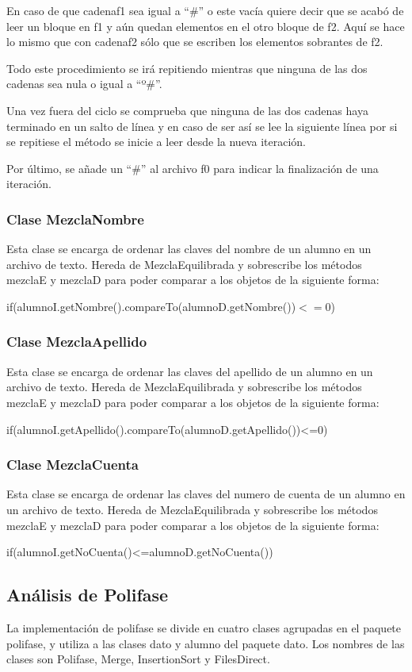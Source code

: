 \documentclass[11pt]{article}
\begin{document}
\begin{itemize}
\par 
En caso de que cadenaf1 sea igual a “\#” o este vacía quiere decir que se acabó de leer un bloque en f1 y aún quedan elementos en el otro bloque de f2. Aquí se hace lo mismo que con cadenaf2 sólo que se escriben los elementos sobrantes de f2.
\par 
Todo este procedimiento se irá repitiendo mientras que ninguna de las dos cadenas sea nula o igual a “º\#”.
\par 
Una vez fuera del ciclo se comprueba que ninguna de las dos cadenas haya terminado en un salto de línea y en caso de ser así se lee la siguiente línea por si se repitiese el método se inicie a leer desde la nueva iteración.
\par 
Por último, se añade un “\#” al archivo f0 para indicar la finalización de una iteración.
\end{itemize}

\subsubsection{Clase MezclaNombre}
Esta clase se encarga de ordenar las claves del nombre de un alumno en un archivo de texto. Hereda de MezclaEquilibrada y sobrescribe los métodos mezclaE y mezclaD para poder comparar a los objetos de la siguiente forma:
\par
if(alumnoI.getNombre().compareTo(alumnoD.getNombre())$<=0$)
\subsubsection{Clase MezclaApellido}
Esta clase se encarga de ordenar las claves del apellido de un alumno en un archivo de texto. Hereda de MezclaEquilibrada y sobrescribe los métodos mezclaE y mezclaD para poder comparar a los objetos de la siguiente forma:
\par 
if(alumnoI.getApellido().compareTo(alumnoD.getApellido())<=0)
\subsubsection{Clase MezclaCuenta}
Esta clase se encarga de ordenar las claves del numero de cuenta de un alumno en un archivo de texto. Hereda de MezclaEquilibrada y sobrescribe los métodos mezclaE y mezclaD para poder comparar a los objetos de la siguiente forma:
\par
if(alumnoI.getNoCuenta()<=alumnoD.getNoCuenta())     

\subsection{Análisis de Polifase}
La implementación de polifase se divide en cuatro clases agrupadas en el paquete polifase, y utiliza a las  clases dato y alumno del paquete dato.
Los nombres de las clases son Polifase, Merge, InsertionSort y FilesDirect.
\end{document}
